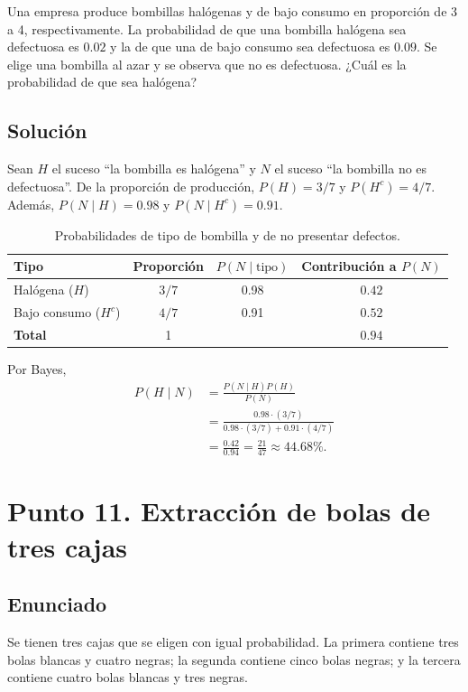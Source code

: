 \documentclass[12pt]{article}
\begin{document}
Una empresa produce bombillas halógenas y de bajo consumo en proporción de 3 a 4, respectivamente. La probabilidad de que una bombilla halógena sea defectuosa es $0.02$ y la de que una de bajo consumo sea defectuosa es $0.09$. Se elige una bombilla al azar y se observa que no es defectuosa. ¿Cuál es la probabilidad de que sea halógena?

\subsection*{Solución}

Sean $H$ el suceso ``la bombilla es halógena'' y $N$ el suceso ``la bombilla no es defectuosa''. De la proporción de producción,
$P(H)=3/7$ y $P(H^c)=4/7$. Además, $P(N\mid H)=0.98$ y $P(N\mid H^c)=0.91$.

\begin{table}[H]
\centering
\small
\renewcommand{\arraystretch}{1.15}
\begin{tabular}{|l|c|c|c|}
\hline
\textbf{Tipo} & \textbf{Proporción} & \textbf{$P(N\mid\text{tipo})$} & \textbf{Contribución a $P(N)$} \\ \hline
Halógena ($H$) & $3/7$ & 0.98 & $0.42$ \\ \hline
Bajo consumo ($H^c$) & $4/7$ & 0.91 & $0.52$ \\ \hline
\textbf{Total} & 1 & & $0.94$ \\ \hline
\end{tabular}
\caption{Probabilidades de tipo de bombilla y de no presentar defectos.}
\label{tab:bombillas-defecto}
\end{table}

Por Bayes,
\[
\begin{aligned}
P(H\mid N)&=\frac{P(N\mid H)P(H)}{P(N)}\\
&=\frac{0.98\cdot(3/7)}{0.98\cdot(3/7)+0.91\cdot(4/7)}\\
&=\frac{0.42}{0.94}=\frac{21}{47}\approx44.68\%.
\end{aligned}
\]

\section*{Punto 11. Extracción de bolas de tres cajas}

\subsection*{Enunciado}

Se tienen tres cajas que se eligen con igual probabilidad. La primera contiene tres bolas blancas y cuatro negras; la segunda contiene cinco bolas negras; y la tercera contiene cuatro bolas blancas y tres negras.
\end{document}
